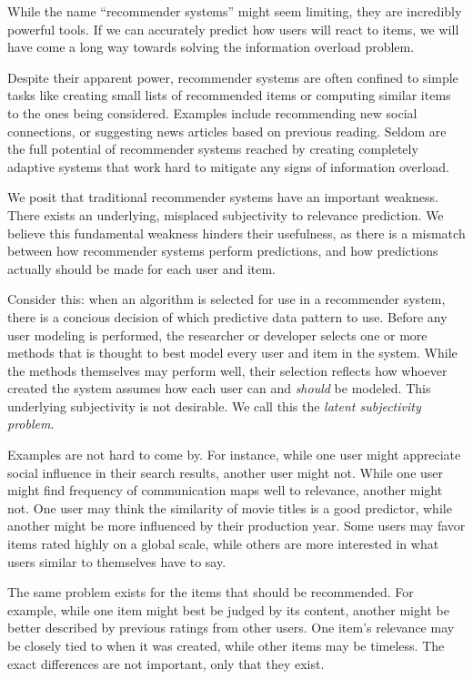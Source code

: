 While the name ``recommender systems'' might seem limiting, they are incredibly powerful tools.
If we can accurately predict how users will react to items,
we will have come a long way towards solving the information overload problem.

Despite their apparent power, recommender systems are often confined
to simple tasks like creating small lists of recommended items
or computing similar items to the ones being considered.
Examples include  
recommending new social connections, or suggesting news articles based on previous reading.
Seldom are the full potential of recommender systems reached by creating completely adaptive
systems that work hard to mitigate any signs of information overload.

We posit that traditional recommender systems have an important weakness.
There exists an underlying, misplaced subjectivity to relevance prediction.
We believe this fundamental weakness hinders their usefulness,
as there is a mismatch between how recommender systems perform predictions,
and how predictions actually should be made for each user and item.



Consider this: 
when an algorithm is selected for use in a recommender system,
there is a concious decision of which predictive data pattern to use.
Before any user modeling is performed, the researcher or developer selects
one or more methods that is thought to best model every user and item in the system.
While the methods themselves may perform well, their selection
reflects how whoever created the system assumes how each user
can and \emph{should} be modeled. This underlying subjectivity is not desirable.
We call this the \emph{latent subjectivity problem}.

Examples are not hard to come by.
For instance, while one user might appreciate social
influence in their search results, another user might not.
While one user might find frequency of communication maps well to relevance,
another might not. 
One user may think the similarity of movie titles is a good predictor,
while another might be more influenced by their production year.
Some users may favor items rated highly on a global scale,
while others are more interested in what users similar to themselves have to say.

The same problem exists for the items that should be recommended. 
For example, while one item might best be judged by its content,
another might be better described by previous ratings from other users.
One item's relevance may be closely tied to when it was created,
while other items may be timeless.
The exact differences are not important, only that they exist.

